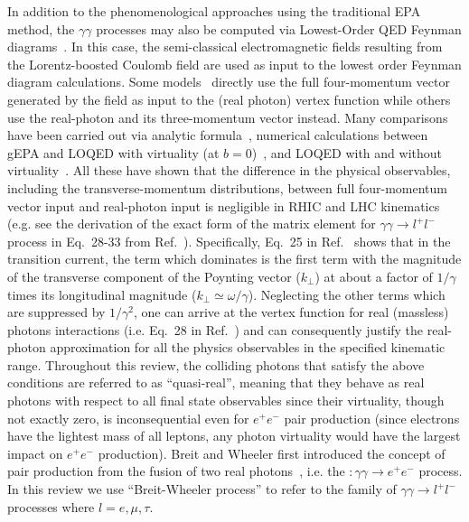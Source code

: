 \documentclass[twocolumn,epjc3]{svjour3}\sloppy
\begin{document}
In addition to the phenomenological approaches using the traditional EPA method, the $\gamma\gamma$ processes may also be computed via Lowest-Order QED Feynman diagrams~\cite{hencken_electromagnetic_1994,Hencken:1995me,zhaInitialTransversemomentumBroadening2020b,liImpactParameterDependence2020}. 
In this case, the semi-classical electromagnetic fields resulting from the Lorentz-boosted Coulomb field are used as input to the lowest order Feynman diagram calculations. 
Some models~\cite{hencken_electromagnetic_1994,zhaInitialTransversemomentumBroadening2020b} directly use the full four-momentum vector generated by the field as input to the (real photon) vertex function while others~\cite{PhysRevC.47.2308,liImpactParameterDependence2020} use the real-photon and its three-momentum vector instead. 
Many comparisons have been carried out via analytic formula~\cite{PhysRevC.47.2308}, numerical calculations between gEPA and LOQED with virtuality (at $b=0$)~\cite{hencken_electromagnetic_1994}, and LOQED with and without virtuality~\cite{zhaInitialTransversemomentumBroadening2020b,liImpactParameterDependence2020}. All these have shown that the difference in the physical observables, including the transverse-momentum distributions, between full four-momentum vector input and real-photon input is negligible in RHIC and LHC kinematics (e.g. see the derivation of the exact form of the matrix element for $\gamma\gamma \rightarrow l^+l^-$ process in Eq.~28-33 from Ref.~\cite{hencken_electromagnetic_1994}). 
Specifically, Eq.~25 in Ref.~\cite{PhysRevC.47.2308} shows that in the transition current, the term which dominates is the first term with the magnitude of the transverse component of the Poynting vector ($k_\perp$) at about a factor of $1/\gamma$ times its longitudinal magnitude  ($k_\perp\simeq\omega/\gamma$). 
Neglecting the other terms which are suppressed by $1/\gamma^2$, one can arrive at the vertex function for real (massless) photons interactions  (i.e. Eq.~28 in Ref.~\cite{PhysRevC.47.2308}) and can consequently justify the real-photon approximation for all the physics observables in the specified kinematic range. Throughout this review, the colliding photons that satisfy the above conditions are referred to as ``quasi-real'', meaning that they behave as real photons with respect to all final state observables since their virtuality, though not exactly zero, is inconsequential even for $e^+e^-$ pair production (since electrons have the lightest mass of all leptons, any photon virtuality would have the largest impact on $e^+e^-$ production). Breit and Wheeler first introduced the concept of pair production from the fusion of two real photons~\cite{Breit-wheeler1934zz}, i.e. the $:\gamma\gamma \rightarrow e^+e^-$ process. In this review we use ``Breit-Wheeler process'' to refer to the family of $\gamma\gamma \rightarrow l^+l^-$ processes where $l=e, \mu, \tau$. 
\end{document}
